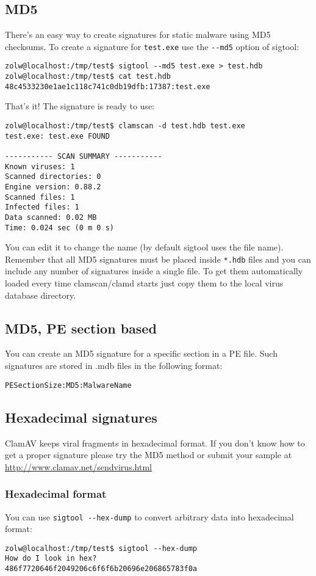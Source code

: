 \documentclass[a4paper,titlepage,12pt]{article}
\begin{document}
    \subsection{MD5}
    There's an easy way to create signatures for static malware using MD5
    checksums. To create a signature for \verb+test.exe+ use the \verb+--md5+
    option of sigtool:
    \begin{verbatim}
zolw@localhost:/tmp/test$ sigtool --md5 test.exe > test.hdb
zolw@localhost:/tmp/test$ cat test.hdb 
48c4533230e1ae1c118c741c0db19dfb:17387:test.exe
    \end{verbatim}
    That's it! The signature is ready to use:
    \begin{verbatim}
zolw@localhost:/tmp/test$ clamscan -d test.hdb test.exe 
test.exe: test.exe FOUND

----------- SCAN SUMMARY -----------
Known viruses: 1
Scanned directories: 0
Engine version: 0.88.2
Scanned files: 1
Infected files: 1
Data scanned: 0.02 MB
Time: 0.024 sec (0 m 0 s)
    \end{verbatim}
    You can edit it to change the name (by default sigtool uses the file name).
    Remember that all MD5 signatures must be placed inside \verb+*.hdb+ files
    and you can include any number of signatures inside a single file. To get
    them automatically loaded every time clamscan/clamd starts just copy them
    to the local virus database directory.

    \subsection{MD5, PE section based}
    You can create an MD5 signature for a specific section in a PE file.
    Such signatures are stored in .mdb files in the following format:
    \begin{verbatim}
PESectionSize:MD5:MalwareName
    \end{verbatim}

    \subsection{Hexadecimal signatures}
    ClamAV keeps viral fragments in hexadecimal format. If you don't know how
    to get a proper signature please try the MD5 method or submit your sample
    at \url{http://www.clamav.net/sendvirus.html}

    \subsubsection{Hexadecimal format}
    You can use \verb+sigtool --hex-dump+ to convert arbitrary data into
    hexadecimal format:
    \begin{verbatim}
zolw@localhost:/tmp/test$ sigtool --hex-dump
How do I look in hex?
486f7720646f2049206c6f6f6b20696e206865783f0a
    \end{verbatim}
\end{document}
